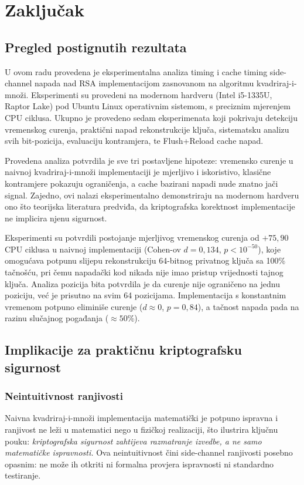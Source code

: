 
\chapter{Zaključak}
\label{ch:zakljucak}

\section{Pregled postignutih rezultata}

U ovom radu provedena je eksperimentalna analiza timing i cache timing side-channel napada nad RSA implementacijom zasnovanom na algoritmu kvadriraj-i-množi. Eksperimenti su provedeni na modernom hardveru (Intel i5-1335U, Raptor Lake) pod Ubuntu Linux operativnim sistemom, s preciznim mjerenjem CPU ciklusa. Ukupno je provedeno sedam eksperimenata koji pokrivaju detekciju vremenskog curenja, praktični napad rekonstrukcije ključa, sistematsku analizu svih bit-pozicija, evaluaciju kontramjera, te Flush+Reload cache napad.

Provedena analiza potvrdila je sve tri postavljene hipoteze: vremensko curenje u naivnoj kvadriraj-i-množi implementaciji je mjerljivo i iskoristivo, klasične kontramjere pokazuju ograničenja, a cache bazirani napadi nude znatno jači signal. Zajedno, ovi nalazi eksperimentalno demonstriraju na modernom hardveru ono što teorijska literatura predviđa, da kriptografska korektnost implementacije ne implicira njenu sigurnost.

Eksperimenti su potvrdili postojanje mjerljivog vremenskog curenja od $+75{,}90$ CPU ciklusa u naivnoj implementaciji (Cohen-ov $d = 0{,}134$, $p < 10^{-50}$), koje omogućava potpunu slijepu rekonstrukciju 64-bitnog privatnog ključa sa 100\% tačnošću, pri čemu napadački kod nikada nije imao pristup vrijednosti tajnog ključa. Analiza pozicija bita potvrdila je da curenje nije ograničeno na jednu poziciju, već je prisutno na svim 64 pozicijama. Implementacija s konstantnim vremenom potpuno eliminiše curenje ($d \approx 0$, $p = 0{,}84$), a tačnost napada pada na razinu slučajnog pogađanja ($\approx 50\%$).
\\

\section{Implikacije za praktičnu kriptografsku sigurnost}

\subsection{Neintuitivnost ranjivosti}
Naivna kvadriraj-i-množi implementacija matematički je potpuno ispravna i ranjivost ne leži u matematici nego u fizičkoj realizaciji, što ilustrira ključnu pouku: \textit{kriptografska sigurnost zahtijeva razmatranje izvedbe, a ne samo matematičke ispravnosti.} Ova neintuitivnost čini side-channel ranjivosti posebno opasnim: ne može ih otkriti ni formalna provjera ispravnosti ni standardno testiranje.

